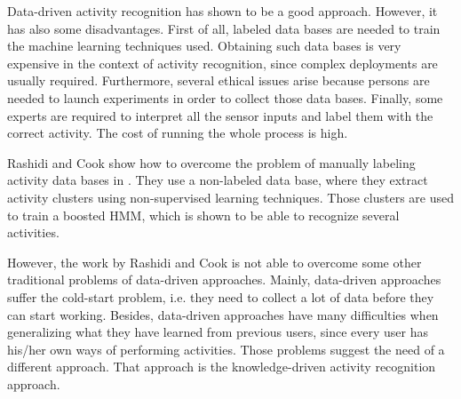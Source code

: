 Data-driven activity recognition has shown to be a good approach. However, it has also some disadvantages. First of all, labeled data bases are needed to train the machine learning techniques used. Obtaining such data bases is very expensive in the context of activity recognition, since complex deployments are usually required. Furthermore, several ethical issues arise because persons are needed to launch experiments in order to collect those data bases. Finally, some experts are required to interpret all the sensor inputs and label them with the correct activity. The cost of running the whole process is high.

Rashidi and Cook show how to overcome the problem of manually labeling activity data bases in \cite{Rashidi2011}. They use a non-labeled data base, where they extract activity clusters using non-supervised learning techniques. Those clusters are used to train a boosted HMM, which is shown to be able to recognize several activities. 

However, the work by Rashidi and Cook is not able to overcome some other traditional problems of data-driven approaches. Mainly, data-driven approaches suffer the cold-start problem, i.e. they need to collect a lot of data before they can start working. Besides, data-driven approaches have many difficulties when generalizing what they have learned from previous users, since every user has his/her own ways of performing activities. Those problems suggest the need of a different approach. That approach is the knowledge-driven activity recognition approach.